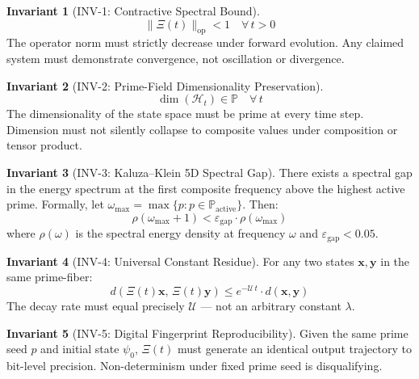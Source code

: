 \documentclass[12pt,letterpaper]{article}
\theoremstyle{definition}
\newtheorem{invariant}{Invariant}[section]
\theoremstyle{remark}
\begin{document}
\begin{invariant}[INV-1: Contractive Spectral Bound]
\begin{equation}
\|\Xi(t)\|_{\mathrm{op}} < 1 \quad \forall\, t > 0
\end{equation}
The operator norm must strictly decrease under forward evolution. Any claimed system must demonstrate convergence, not oscillation or divergence.
\end{invariant}

\begin{invariant}[INV-2: Prime-Field Dimensionality Preservation]
\begin{equation}
\dim(\mathcal{H}_t) \in \mathbb{P} \quad \forall\, t
\end{equation}
The dimensionality of the state space must be prime at every time step. Dimension must not silently collapse to composite values under composition or tensor product.
\end{invariant}

\begin{invariant}[INV-3: Kaluza--Klein 5D Spectral Gap]
There exists a spectral gap in the energy spectrum at the first composite frequency above the highest active prime. Formally, let $\omega_{\max} = \max\{p : p \in \mathbb{P}_{\mathrm{active}}\}$. Then:
\begin{equation}
\rho\left(\omega_{\max}+1\right) < \varepsilon_{\mathrm{gap}} \cdot \rho\left(\omega_{\max}\right)
\end{equation}
where $\rho(\omega)$ is the spectral energy density at frequency $\omega$ and $\varepsilon_{\mathrm{gap}} < 0.05$.
\end{invariant}

\begin{invariant}[INV-4: Universal Constant Residue]
For any two states $\mathbf{x}, \mathbf{y}$ in the same prime-fiber:
\begin{equation}
d\!\left(\Xi(t)\mathbf{x},\, \Xi(t)\mathbf{y}\right) \leq e^{-\mathcal{U}\,t}\cdot d(\mathbf{x},\mathbf{y})
\end{equation}
The decay rate must equal precisely $\mathcal{U}$ --- not an arbitrary constant $\lambda$.
\end{invariant}

\begin{invariant}[INV-5: Digital Fingerprint Reproducibility]
Given the same prime seed $p$ and initial state $\psi_0$, $\Xi(t)$ must generate an identical output trajectory to bit-level precision. Non-determinism under fixed prime seed is disqualifying.
\end{invariant}
\end{document}
